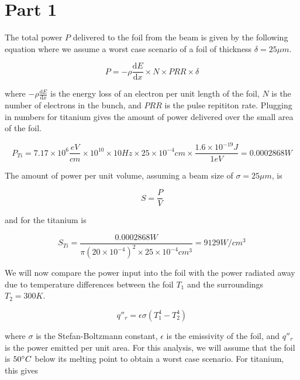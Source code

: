 \documentclass[12pt]{article}
\begin{document}
\section{Part 1}

The total power $P$ delivered to the foil from the beam is given by the following equation where we assume a worst case scenario of a foil of thickness $\delta=25 \mu m$.

\begin{equation}
P=-\rho \frac{\mathrm{d} E}{\mathrm{d} x} \times N \times PRR \times \delta
\end{equation}

where $-\rho \frac{\mathrm{d} E}{\mathrm{d} x}$ is the energy loss of an electron per unit length of the foil, $N$ is the number of electrons in the bunch, and $PRR$ is the pulse repititon rate. Plugging in numbers for titanium gives the amount of power delivered over the small area of the foil.

\begin{equation}
P_{Ti}=7.17 \times 10^6 \frac{eV}{cm} \times 10^{10} \times 10 Hz \times 25 \times 10^{-4} cm \times \frac{1.6 \times 10^{-19} J}{1 eV}=0.0002868 W
\end{equation}

The amount of power per unit volume, assuming a beam size of $ \sigma = 25 \mu m$, is

\begin{equation}
S=\frac{P}{V}
\end{equation}

and for the titanium is

\begin{equation}
S_{Ti}=\frac{0.0002868 W}{\pi (20 \times 10^{-4})^2 \times 25 \times 10^{-4} cm^3}=9129 W/cm^3
\end{equation}

We will now compare the power input into the foil with the power radiated away due to temperature differences between the foil $T_1$ and the surroundings $T_2=300 K$.

\begin{equation}
q''_r=\epsilon \sigma (T_{1}^{4}-T_{2}^{4})
\end{equation}

where $\sigma$ is the Stefan-Boltzmann constant, $\epsilon$ is the emissivity of the foil, and $q''_r$ is the power emitted per unit area. For this analysis, we will assume that the foil is $50 \degree C$ below its melting point to obtain a worst case scenario. For titanium, this gives
\end{document}
